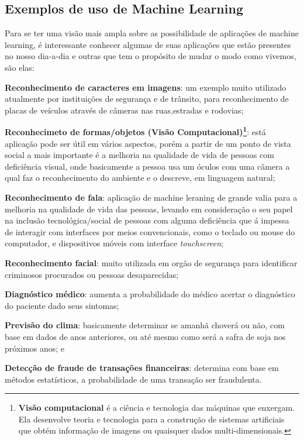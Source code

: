 \subsection{Exemplos de uso de Machine Learning}
\label{cap:exemplos-ml}

Para se ter uma visão mais ampla sobre as possibilidade de aplicações de machine learning,
 é interessante conhecer algumas de suas aplicações que estão presentes no nosso dia-a-dia e outras que tem o propósito de 
 mudar o modo como vivemos, são elas:

 \begin{alineas}
	\item \textbf{Reconhecimento de caracteres em imagens}: um exemplo muito utilizado atualmente por instituições de segurança e de trânsito, para 
	reconhecimento de placas de veículos através de câmeras nas ruas,estradas e rodovias;  
	\item \textbf{Reconhecimeto de formas/objetos (Visão Computacional)\footnote{\textbf{Visão computacional} é a ciência e tecnologia das máquinas que enxergam. Ela desenvolve teoria e tecnologia para a construção de sistemas artificiais que obtém informação de imagens ou quaisquer dados multi-dimensionais.\cite{vscomp}}}: está aplicação pode ser útil em vários aspectos, porém a partir de um ponto de vista social a mais importante 
	é a melhoria na qualidade de vida de pessoas com deficiência visual, onde basicamente a pessoa usa um óculos com uma câmera a qual faz o reconhecimento do ambiente
	e o descreve, em linguagem natural;  
	\item \textbf{Reconhecimento de fala}: aplicação de machine leraning de grande valia para a melhoria na qualidade de vida das pessoas,
	levando em consideração o seu papel na inclusão tecnológica/social de pessoas com alguma deficiência que á impessa de interagir 
	com interfaces por meios convencionais, como o teclado ou  mouse do computador, e dispositivos móveis com interface \textit{touchscreen};
	\item \textbf{Reconhecimento facial}: muito utilizada em orgão de segurança para identificar criminosos procurados ou pessoas desaparecidas;
	\item \textbf{Diagnóstico médico}: aumenta a probabilidade do médico acertar o diagnóstico do paciente dado seus sintomas;   
	\item \textbf{Previsão do clima}: basicamente determinar se amanhã choverá ou não, com base em dados de anos anteriores, ou até mesmo como será a 
	safra de soja nos próximos anos; e 
	\item \textbf{Detecção de fraude de transações financeiras}: determina com base em métodos estatísticos, a probabilidade de uma transação ser fraudulenta.
 \end{alineas}

